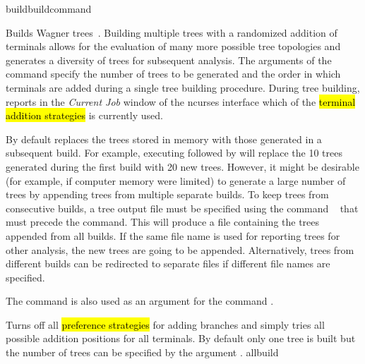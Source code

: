 \begin{command}{build}{buildcommand}

	
 	\begin{poydescription}
        Builds Wagner trees~\cite{farris1970}. Building multiple trees with a randomized addition of terminals allows for
        the evaluation of many more possible tree topologies and generates a diversity of trees for subsequent analysis. 
        The arguments of the command  specify the number of trees to be generated and
        the order in which terminals are added during a single tree building procedure. During tree
        building, \poy reports in the \emph{Current Job} window of the ncurses interface
        which of the \hl{terminal addition strategies} is currently used.
        

        By default \poy replaces the trees stored in memory with those generated
        in a subsequent build. For example, executing 
        followed by  will replace the 10 trees generated
        during the first build with 20 new trees. However, it might be desirable
        (for example, if computer memory were limited) to generate a large number of trees by
        appending trees from multiple separate builds. To keep trees from consecutive
        builds, a tree output file must be specified using the command ~ that must 
        precede the  command. This will produce a file
        containing the trees appended from all builds. If the same file name is used for reporting
         trees for other analysis, the new trees are going to be appended. Alternatively, trees from different
        builds can be redirected to separate files if different file names are specified.
        
        The command  is also used as
        an argument for the command .
   	\end{poydescription}

	\begin{arguments}

            {Turns off all \hl{preference strategies} for adding branches
            and simply tries all possible addition positions for
            all terminals.  By default only one tree is built but
            the number of  trees can be specified by the argument .}
            {allbuild}


\end{arguments}
\end{command}
